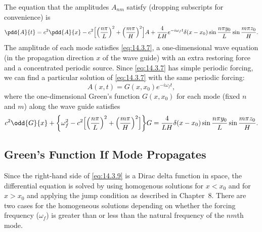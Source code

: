 The equation that the amplitudes $A_{nm}$ satisfy (dropping subscripts for convenience) is
\begin{equation}
\label{eq:14.3.7}
\pdd{A}{t} = c^2\pdd{A}{x} - c^2\Bigl[\Bigl(\frac{n\pi}{L}\Bigr)^2 + \Bigl(\frac{m\pi}{H}\Bigr)^2\Bigr]A + \frac{4}{LH}e^{-i\omega_f t}\delta(x - x_0)\sin\frac{n\pi y_0}{L}\sin\frac{m\pi z_0}{H}.
\end{equation}
The amplitude of each mode satisfies \eqref{eq:14.3.7}, a one-dimensional wave equation (in the propagation direction $x$ of the wave guide) with an extra restoring force and a concentrated periodic source.  Since \eqref{eq:14.3.7} has simple periodic forcing, we can find a particular solution of \eqref{eq:14.3.7} with the same periodic forcing:
\begin{equation}
\label{eq:14.3.8}
A(x,t) = G(x,x_0)e^{-i\omega_f t},
\end{equation}
where the one-dimensional Green's function $G(x,x_0)$ for each mode (fixed $n$ and $m$) along the wave guide satisfies
\begin{equation}
\label{eq:14.3.9}
c^2\odd{G}{x} + \biggl\{\omega_f^2 - c^2\Bigl[\Bigl(\frac{n\pi}{L}\Bigr)^2 + \Bigl(\frac{m\pi}{H}\Bigr)^2\Bigr]\biggr\}G = \frac{4}{LH}\delta(x - x_0)\sin\frac{n\pi y_0}{L}\sin\frac{m\pi z_0}{H}.
\end{equation}

\subsection{Green's Function If Mode Propagates}
\label{sec:greens-function-propagates}

Since the right-hand side of \eqref{eq:14.3.9} is a Dirac delta function in space, the differential equation is solved by using homogenous solutions for $x < x_0$ and for $x > x_0$ and applying the jump condition as described in Chapter~8.  There are two cases for the homogeneous solutions depending on whether the forcing frequency ($\omega_f$) is greater than or less than the natural frequency of the $nm$th mode.

